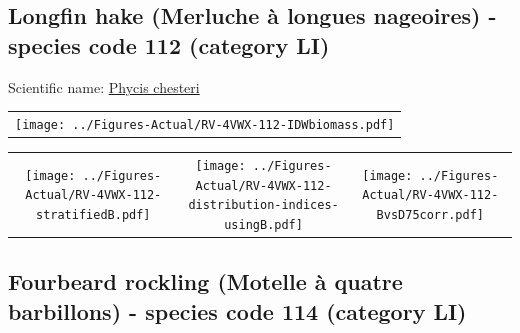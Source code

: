 \documentclass[12pt]{article}\usepackage[]{graphicx}\usepackage[]{color}
\begin{document}
\renewcommand\thefigure{\thesubsection\Alph{figure}}

\setcounter{figure}{0}

\hypertarget{sec:112}{%
\subsection{Longfin hake (Merluche à longues nageoires) - species code 112 (category LI)}\label{sec:112}}

  


Scientific name: \href{http://www.marinespecies.org/aphia.php?p=taxdetails\&id=158988}{Phycis chesteri} \newline
\begin{minipage}{1.0\textwidth}
 \begin{tabular}{c}
\texttt{[image: ../Figures-Actual/RV-4VWX-112-IDWbiomass.pdf]} \\ 
\end{tabular} 
\end{minipage}
\newline

\vspace{1cm}
\begin{minipage}{1.0\textwidth}
 \begin{tabular}{ccc}
\texttt{[image: ../Figures-Actual/RV-4VWX-112-stratifiedB.pdf]} & 
\texttt{[image: ../Figures-Actual/RV-4VWX-112-distribution-indices-usingB.pdf]} & 
\texttt{[image: ../Figures-Actual/RV-4VWX-112-BvsD75corr.pdf]} \\ 
\end{tabular} 
\end{minipage}
\clearpage

\renewcommand\thefigure{\thesubsection\Alph{figure}}

\setcounter{figure}{0}

\hypertarget{sec:114}{%
\subsection{Fourbeard rockling (Motelle à quatre barbillons) - species code 114 (category LI)}\label{sec:114}}
\end{document}
